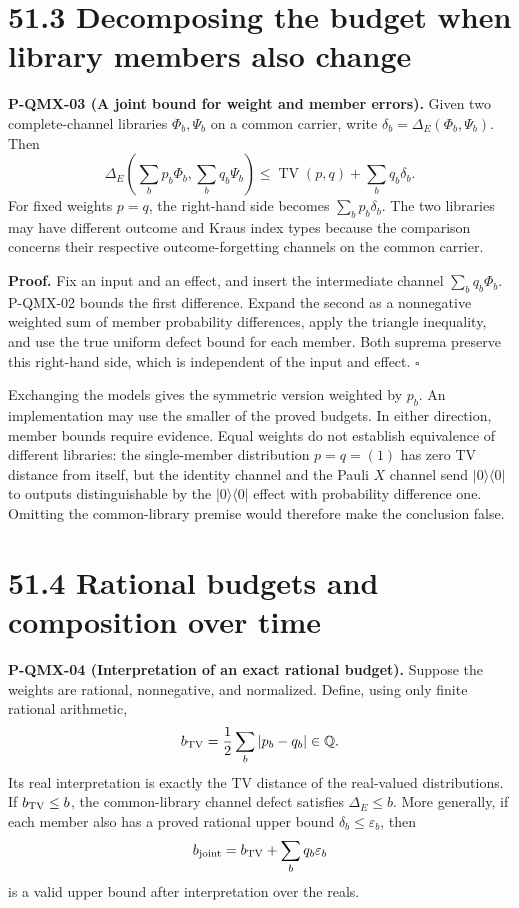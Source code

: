 \documentclass[
  11pt,
  oneside]{book}
\begin{document}
\section{51.3 Decomposing the budget when library members also change}

\label{p-qmx-03}{}

\textbf{P-QMX-03 (A joint bound for weight and member errors).} Given
two complete-channel libraries \(\Phi_b,\Psi_b\) on a common carrier,
write \(\delta_b=\Delta_E(\Phi_b,\Psi_b)\). Then \[
\Delta_E\left(\sum_b p_b\Phi_b,\sum_b q_b\Psi_b\right)
\le\operatorname{TV}(p,q)+\sum_b q_b\delta_b.
\] For fixed weights \(p=q\), the right-hand side becomes
\(\sum_b p_b\delta_b\). The two libraries may have different outcome and
Kraus index types because the comparison concerns their respective
outcome-forgetting channels on the common carrier.

\textbf{Proof.} Fix an input and an effect, and insert the intermediate
channel \(\sum_b q_b\Phi_b\). P-QMX-02 bounds the first difference.
Expand the second as a nonnegative weighted sum of member probability
differences, apply the triangle inequality, and use the true uniform
defect bound for each member. Both suprema preserve this right-hand
side, which is independent of the input and effect. \(\square\)

Exchanging the models gives the symmetric version weighted by \(p_b\).
An implementation may use the smaller of the proved budgets. In either
direction, member bounds require evidence. Equal weights do not
establish equivalence of different libraries: the single-member
distribution \(p=q=(1)\) has zero TV distance from itself, but the
identity channel and the Pauli \(X\) channel send \(|0\rangle\langle0|\)
to outputs distinguishable by the \(|0\rangle\langle0|\) effect with
probability difference one. Omitting the common-library premise would
therefore make the conclusion false.

\section{51.4 Rational budgets and composition over time}

\label{p-qmx-04}{}

\textbf{P-QMX-04 (Interpretation of an exact rational budget).} Suppose
the weights are rational, nonnegative, and normalized. Define, using
only finite rational arithmetic, \[
b_{\rm TV}=\frac12\sum_b|p_b-q_b|\in\mathbb Q.
\] Its real interpretation is exactly the TV distance of the real-valued
distributions. If \(b_{\rm TV}\le b\), the common-library channel defect
satisfies \(\Delta_E\le b\). More generally, if each member also has a
proved rational upper bound \(\delta_b\le\varepsilon_b\), then \[
b_{\rm joint}=b_{\rm TV}+\sum_b q_b\varepsilon_b
\] is a valid upper bound after interpretation over the reals.
\end{document}
